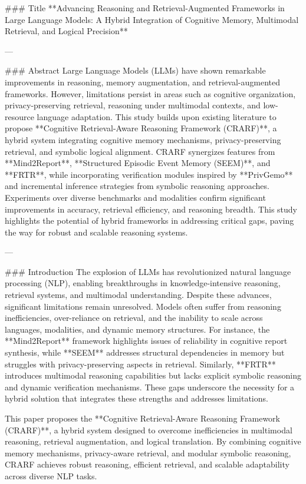 ### Title
**Advancing Reasoning and Retrieval-Augmented Frameworks in Large Language Models: A Hybrid Integration of Cognitive Memory, Multimodal Retrieval, and Logical Precision**

---

### Abstract
Large Language Models (LLMs) have shown remarkable improvements in reasoning, memory augmentation, and retrieval-augmented frameworks. However, limitations persist in areas such as cognitive organization, privacy-preserving retrieval, reasoning under multimodal contexts, and low-resource language adaptation. This study builds upon existing literature to propose **Cognitive Retrieval-Aware Reasoning Framework (CRARF)**, a hybrid system integrating cognitive memory mechanisms, privacy-preserving retrieval, and symbolic logical alignment. CRARF synergizes features from **Mind2Report**, **Structured Episodic Event Memory (SEEM)**, and **FRTR**, while incorporating verification modules inspired by **PrivGemo** and incremental inference strategies from symbolic reasoning approaches. Experiments over diverse benchmarks and modalities confirm significant improvements in accuracy, retrieval efficiency, and reasoning breadth. This study highlights the potential of hybrid frameworks in addressing critical gaps, paving the way for robust and scalable reasoning systems.

---

### Introduction
The explosion of LLMs has revolutionized natural language processing (NLP), enabling breakthroughs in knowledge-intensive reasoning, retrieval systems, and multimodal understanding. Despite these advances, significant limitations remain unresolved. Models often suffer from reasoning inefficiencies, over-reliance on retrieval, and the inability to scale across languages, modalities, and dynamic memory structures. For instance, the **Mind2Report** framework highlights issues of reliability in cognitive report synthesis, while **SEEM** addresses structural dependencies in memory but struggles with privacy-preserving aspects in retrieval. Similarly, **FRTR** introduces multimodal reasoning capabilities but lacks explicit symbolic reasoning and dynamic verification mechanisms. These gaps underscore the necessity for a hybrid solution that integrates these strengths and addresses limitations.

This paper proposes the **Cognitive Retrieval-Aware Reasoning Framework (CRARF)**, a hybrid system designed to overcome inefficiencies in multimodal reasoning, retrieval augmentation, and logical translation. By combining cognitive memory mechanisms, privacy-aware retrieval, and modular symbolic reasoning, CRARF achieves robust reasoning, efficient retrieval, and scalable adaptability across diverse NLP tasks.

